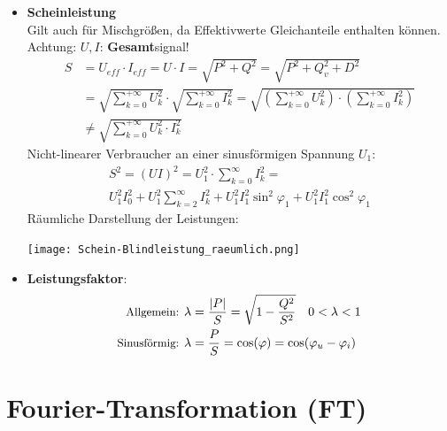 \begin{multicols*}{2}
\begin{itemize}
	      
	      \begin{mdframed}[style=exercise,frametitle=Verzerrungsblindleistung $D$]
	      		      {\small auch Oberwellen-, Deformationsblindleistung.}
		      \[
			      D^2 = U_1^2\cdot(I^2-I_1^2) = S^2(1-g^2)
		      \]
\small{aus Mischtermen als Produkte von $U$ und $I$ unterschiedlicher Frequenzen.}
	      \end{mdframed}
  		\item \textbf{Scheinleistung}\\
{\small Gilt auch f\"ur Mischgr\"o\ss en, da Effektivwerte Gleichanteile enthalten k\"onnen. Achtung: $U, I$: \textbf{Gesamt}signal!}
\begin{align*}
	      S &= U_{\mathit{eff}}\cdot I_{\mathit{eff}} = U\cdot I = \sqrt{P^2+Q^2} = \sqrt{P^2+Q_v^2+D^2}\\
	      &=  \sqrt{\sum_{k=0}^{+\infty} U_k^2} \cdot \sqrt{\sum_{k=0}^{+\infty} I_k^2} = \sqrt{\left( \sum_{k=0}^{+\infty} U_k^2 \right) \cdot \left( \sum_{k=0}^{+\infty} I_k^2 \right)}\\
	      &\neq \sqrt{\sum_{k=0}^{+\infty} U_k^2 \cdot I_k^2}
\end{align*}
	      	Nicht-linearer Verbraucher an einer sinusförmigen Spannung $U_1$:
	      	\vspace{-1.5em}
	      	\begin{multline*}
	      		S^{2}=(U I)^{2}=U_{1}^{2} \cdot \sum_{k=0}^{\infty} I_{k}^{2}=\\U_{1}^{2} I_{0}^{2}+U_{1}^{2} \sum_{k=2}^{\infty} I_{k}^{2}+U_{1}^{2} I_{1}^{2} \sin ^{2} \varphi_{1}+U_{1}^{2} I_{1}^{2} \cos ^{2} \varphi_{1}
	      	\end{multline*}
	      Räumliche Darstellung der Leistungen:
	      \begin{center}
	      	\vspace{-0.5em}
	      	\texttt{[image: Schein-Blindleistung\_raeumlich.png]}
	      	\vspace{-0.6em}
	      \end{center}
	      \item \textbf{Leistungsfaktor}:
\begin{align*}
	\text{\small Allgemein: }
	      \lambda &= \frac{|P|}{S} = \sqrt{1-\frac{Q^2}{S^2}} \quad 0<\lambda<1\\
	     \text{\small Sinusf\"ormig: }\lambda &= \frac{P}{S}=\cos(\varphi)=\cos(\varphi_u-\varphi_i)
\end{align*}
\end{itemize}
\clearpage
\section{Fourier-Transformation (FT)}

\end{multicols*}
